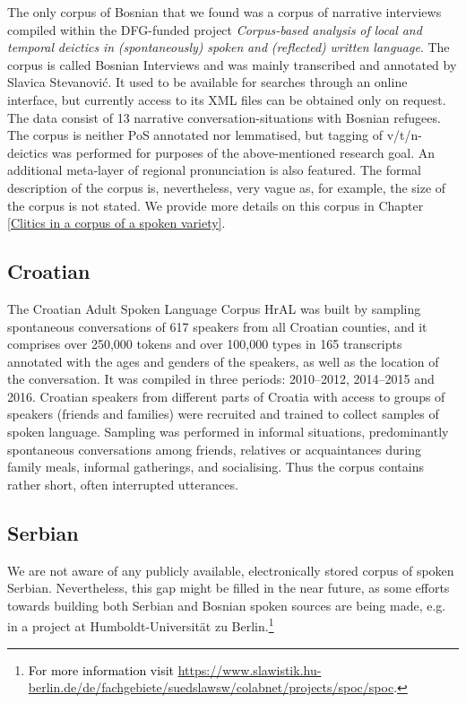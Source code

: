 The only corpus of Bosnian that we found was a corpus of narrative interviews compiled within the DFG-funded project \textit{Corpus-based} \textit{analysis} \textit{of} \textit{local} \textit{and} \textit{temporal} \textit{deictics} \textit{in} \textit{(spontaneously)} \textit{spoken} \textit{and} \textit{(reflected)} \textit{written} \textit{language}. The corpus is called Bosnian Interviews \citep{RaeckeStevanovic01} and was mainly transcribed and annotated by Slavica Stevanović. It used to be available for searches through an online interface, but currently access to its XML files can be obtained only on request. The data consist of 13 narrative conversation-situations with Bosnian refugees. The corpus is neither PoS annotated nor lemmatised, but tagging of v/t/n-deictics was performed for purposes of the above-mentioned research goal. An additional meta-layer of regional pronunciation is also featured. The formal description of the corpus is, nevertheless, very vague as, for example, the size of the corpus is not stated. We provide more details on this corpus in Chapter \ref{Clitics in a corpus of a spoken variety}.

\subsection{Croatian}

The Croatian Adult Spoken Language Corpus HrAL \citep{KuvacHrzica16} was built by sampling spontaneous conversations of 617 speakers from all Croatian counties, and it comprises over 250,000 tokens and over 100,000 types in 165 transcripts annotated with the ages and genders of the speakers, as well as the location of the conversation. It was compiled in three periods: 2010--2012, 2014--2015 and 2016. Croatian speakers from different parts of Croatia with access to groups of speakers (friends and families) were recruited and trained to collect samples of spoken language. Sampling was performed in informal situations, predominantly spontaneous conversations among friends, relatives or acquaintances during family meals, informal gatherings, and socialising. Thus the corpus contains rather short, often interrupted utterances.

\subsection{Serbian}

We are not aware of any publicly available, electronically stored corpus of spoken Serbian. Nevertheless, this gap might be filled in the near future, as some efforts towards building both Serbian and Bosnian spoken sources are being made, e.g. in a project at Humboldt-Universität zu Berlin.\footnote{\textcolor{black}{For more information visit} \url{https://www.slawistik.hu-berlin.de/de/fachgebiete/suedslawsw/colabnet/projects/spoc/spoc}.}

